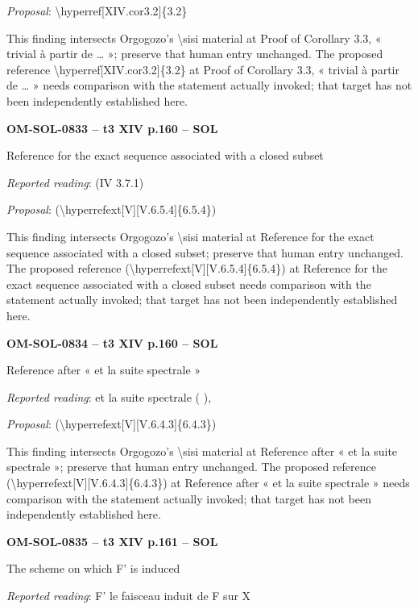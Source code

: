 \emph{Proposal}: \textbackslash{}hyperref[XIV.cor3.2]\{3.2\}\par
This finding intersects Orgogozo's \textbackslash{}sisi material at Proof of Corollary 3.3, « trivial à partir de … »; preserve that human entry unchanged. The proposed reference \textbackslash{}hyperref[XIV.cor3.2]\{3.2\} at Proof of Corollary 3.3, « trivial à partir de … » needs comparison with the statement actually invoked; that target has not been independently established here.\par
\par\noindent\textbf{OM-SOL-0833 -- t3 XIV p.160 -- SOL}\par
Reference for the exact sequence associated with a closed subset\par
\emph{Reported reading}: (IV 3.7.1)\par
\emph{Proposal}: (\textbackslash{}hyperrefext[V][V.6.5.4]\{6.5.4\})\par
This finding intersects Orgogozo's \textbackslash{}sisi material at Reference for the exact sequence associated with a closed subset; preserve that human entry unchanged. The proposed reference (\textbackslash{}hyperrefext[V][V.6.5.4]\{6.5.4\}) at Reference for the exact sequence associated with a closed subset needs comparison with the statement actually invoked; that target has not been independently established here.\par
\par\noindent\textbf{OM-SOL-0834 -- t3 XIV p.160 -- SOL}\par
Reference after « et la suite spectrale »\par
\emph{Reported reading}: et la suite spectrale ( ),\par
\emph{Proposal}: (\textbackslash{}hyperrefext[V][V.6.4.3]\{6.4.3\})\par
This finding intersects Orgogozo's \textbackslash{}sisi material at Reference after « et la suite spectrale »; preserve that human entry unchanged. The proposed reference (\textbackslash{}hyperrefext[V][V.6.4.3]\{6.4.3\}) at Reference after « et la suite spectrale » needs comparison with the statement actually invoked; that target has not been independently established here.\par
\par\noindent\textbf{OM-SOL-0835 -- t3 XIV p.161 -- SOL}\par
The scheme on which F' is induced\par
\emph{Reported reading}: F' le faisceau induit de F sur X\par
